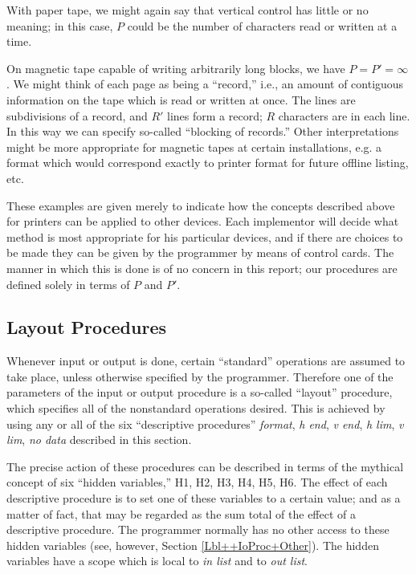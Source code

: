 \documentclass[a4paper,11pt]{article}
\begin{document}
With paper tape, we might again say that vertical control has little
or no meaning; in this case, $P$ could be the number of characters
read or written at a time.

On magnetic tape capable of writing arbitrarily long blocks, we have
$P = P' = \infty$.  We might think of each page as being a ``record,''
i.e., an amount of contiguous information on the tape which is read or
written at once.  The lines are subdivisions of a record, and $R'$
lines form a record; $R$ characters are in each line.  In this way we
can specify so-called ``blocking of records.''  Other interpretations
might be more appropriate for magnetic tapes at certain installations,
e.g. a format which would correspond exactly to printer format for
future offline listing, etc.

These examples are given merely to indicate how the concepts described
above for printers can be applied to other devices.  Each implementor
will decide what method is most appropriate for his particular
devices, and if there are choices to be made they can be given by the
programmer by means of control cards.  The manner in which this is
done is of no concern in this report; our procedures are defined
solely in terms of $P$ and $P'$.

\subsection{Layout Procedures}
\label{Lbl++IoProc+Layout}

Whenever input or output is done, certain ``standard'' operations are
assumed to take place, unless otherwise specified by the programmer.
Therefore one of the parameters of the input or output procedure is a
so-called ``layout'' procedure, which specifies all of the nonstandard
operations desired.  This is achieved by using any or all of the six
``descriptive procedures'' {\it format}, {\it h end}, {\it v end},
{\it h lim}, {\it v lim}, {\it no data} described in this section.

The precise action of these procedures can be described in terms of
the mythical concept of six ``hidden variables,'' H1, H2, H3, H4, H5,
H6.  The effect of each descriptive procedure is to set one of these
variables to a certain value; and as a matter of fact, that may be
regarded as the sum total of the effect of a descriptive procedure.
The programmer normally has no other access to these hidden variables
(see, however, Section \ref{Lbl++IoProc+Other}).  The hidden variables
have a scope which is local to {\it in list} and to {\it out list}.
\end{document}
